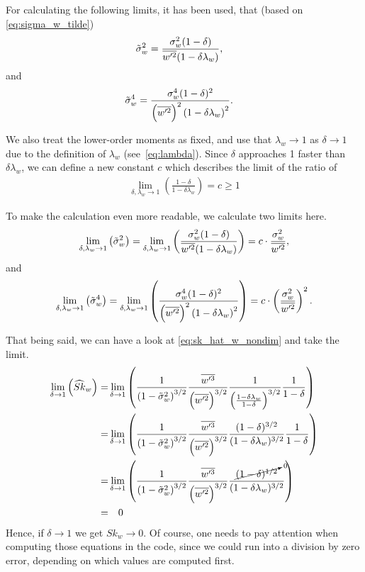 For calculating the following limits, it has been used, that (based on \cref{eq:sigma_w_tilde})
\begin{align}
    \label{eq:sigma_w_tilde_2}
    \tilde{\sigma}_w^2
    &= \frac{\sigma_w^2 (1-\delta)}{\overline{w'^2} (1-\delta\lambda_w)},
\end{align}
and
\begin{align}
    \label{eq:sigma_w_tilde_4}
    \tilde{\sigma}_w^4
    &= \frac{\sigma_w^4 (1-\delta)^2}{\left(\overline{w'^2}\right)^2 \left(1-\delta\lambda_w\right)^2}.
\end{align}

We also treat the lower-order moments as fixed,
and use that $\lambda_w \to 1$ as $\delta \to 1$ due to the definition of $\lambda_w$ (see~\cref{eq:lambda}).
Since $\delta$ approaches 1 faster than $\delta \lambda_w$,
we can define a new constant $c$ which describes the limit of the ratio of
\begin{align}
    \lim_{\delta, \lambda_w \to 1} \left( \frac{1-\delta}{1-\delta\lambda_w} \right) = c \geq 1
\end{align}

To make the calculation even more readable,
we calculate two limits here.
\begin{align}
    \label{eq:sigma_w_tilde_2_limit_delta_to_1}
    \lim_{\delta, \lambda_w \to 1}\left(\tilde{\sigma}_w^2\right)
    = \lim_{\delta, \lambda_w \to 1}\left(\frac{\sigma_w^2 (1-\delta)}{\overline{w'^2} (1-\delta\lambda_w)}\right)
    = c \cdot \frac{\sigma_w^2}{\overline{w'^2}},
\end{align}
and
\begin{align}
    \label{eq:sigma_w_tilde_4_limit_delta_to_1}
    \lim_{\delta, \lambda_w \to 1}\left(\tilde{\sigma}_w^4\right)
    = \lim_{\delta, \lambda_w \to 1}\left(\frac{\sigma_w^4 (1-\delta)^2}{\left(\overline{w'^2}\right)^2 \left(1-\delta\lambda_w\right)^2}\right)
    = c \cdot \left(\frac{\sigma_w^2}{\overline{w'^2}}\right)^2.
\end{align}

That being said, we can have a look at \cref{eq:sk_hat_w_nondim} and take the limit.
\begin{align}
    \lim_{\delta \to 1}\left(\widehat{Sk}_w\right)
    =&\lim_{\delta \to 1}
    \left(
    \frac{1}{\left( 1 - \tilde{\sigma}_w^2 \right)^{3/2}}
    \frac{\overline{w'^3}}{\left(\overline{w'^2} \right)^{3/2}}
    \frac{1}{\left(\frac{1-\delta \lambda_w}{1-\delta}\right)^{3/2}}
    \frac{1}{1-\delta}
    \right)
    \nonumber \\
    =&\lim_{\delta \to 1}
    \left(
    \frac{1}{\left( 1 - \tilde{\sigma}_w^2 \right)^{3/2}}
    \frac{\overline{w'^3}}{\left(\overline{w'^2} \right)^{3/2}}
    \frac{(1-\delta)^{3/2}}{(1-\delta \lambda_w)^{3/2}}
    \frac{1}{1-\delta}
    \right)
    \nonumber \\
    =&\lim_{\delta \to 1}
    \left(
    \frac{1}{\left( 1 - \tilde{\sigma}_w^2 \right)^{3/2}}
    \frac{\overline{w'^3}}{\left(\overline{w'^2} \right)^{3/2}}
    \frac{\cancelto{0}{(1-\delta)^{1/2}}}{(1-\delta \lambda_w)^{3/2}}
    \right)
    \nonumber \\
    =& \quad 0
\end{align}
Hence, if $\delta \to 1$ we get $Sk_w \to 0$.
Of course, one needs to pay attention when computing those equations in the code,
since we could run into a division by zero error,
depending on which values are computed first.

